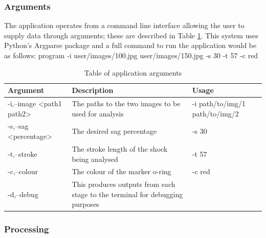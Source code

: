 		\subsubsection{Arguments}
			The application operates from a command line interface allowing the user to supply data through arguments; these are described in Table \ref{tab:arguments}. This system uses Python's Argparse package and a full command to run the application would be as follows:
			{\centering \ttfamily program -i user/images/100.jpg user/images/150.jpg -s 30 -t 57 -c red}
			\begin{table}[h!]
				\centering
				\caption{Table of application arguments}
				\label{tab:arguments}
				\begin{tabular}{|l|p{}|p{}|}
					\hline
					\bfseries Argument&\bfseries Description&\bfseries Usage\\
					\hline
					{\ttfamily -i,--image <path1 path2>}&The paths to the two images to be used for analysis&{\ttfamily -i path/to/img/1 path/to/img/2}\\
					{\ttfamily -s,--sag <percentage>}&The desired sag percentage&{\ttfamily -s 30}\\
					{\ttfamily -t,--stroke}&The stroke length of the shock being analysed&{\ttfamily -t 57}\\
					{\ttfamily -c,--colour}&The colour of the marker o-ring&{\ttfamily -c red}\\
					{\ttfamily -d,--debug}&This produces outputs from each stage to the terminal for debugging purposes&\\
					\hline
				\end{tabular}
			\end{table}
		\subsubsection{Processing}
